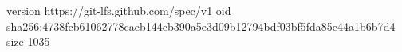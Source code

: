 version https://git-lfs.github.com/spec/v1
oid sha256:4738fcb61062778caeb144cb390a5e3d09b12794bdf03bf5fda85e44a1b6b7d4
size 1035

